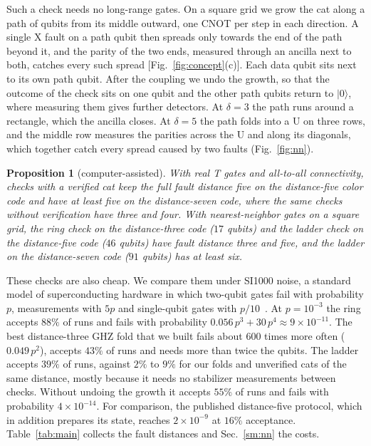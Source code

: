 \documentclass[aps,prl,reprint,twocolumn,amsmath,amssymb,floatfix,nofootinbib,superscriptaddress]{revtex4-2}
\newtheorem{proposition}[theorem]{Proposition}
\theoremstyle{definition}
\theoremstyle{remark}
\begin{document}
Such a check needs no long-range gates. On a square grid we grow the cat along a path of qubits from its middle outward, one CNOT per step in each direction. A single X fault on a path qubit then spreads only towards the end of the path beyond it, and the parity of the two ends, measured through an ancilla next to both, catches every such spread [Fig.~\ref{fig:concept}(c)]. Each data qubit sits next to its own path qubit. After the coupling we undo the growth, so that the outcome of the check sits on one qubit and the other path qubits return to $|0\rangle$, where measuring them gives further detectors. At $\delta=3$ the path runs around a rectangle, which the ancilla closes. At $\delta=5$ the path folds into a U on three rows, and the middle row measures the parities across the U and along its diagonals, which together catch every spread caused by two faults (Fig.~\ref{fig:nn}).
\begin{proposition}[computer-assisted]\label{prop:vcat}\label{prop:nn}
With real T gates and all-to-all connectivity, checks with a verified cat keep the full fault distance five on the distance-five color code and have at least five on the distance-seven code, where the same checks without verification have three and four. With nearest-neighbor gates on a square grid, the ring check on the distance-three code ($17$ qubits) and the ladder check on the distance-five code ($46$ qubits) have fault distance three and five, and the ladder on the distance-seven code ($91$ qubits) has at least six.
\end{proposition}
These checks are also cheap. We compare them under SI1000 noise, a standard model of superconducting hardware in which two-qubit gates fail with probability $p$, measurements with $5p$ and single-qubit gates with $p/10$~\cite{si1000}. At $p=10^{-3}$ the ring accepts $88\%$ of runs and fails with probability $0.056\,p^3+30\,p^4\approx9\times10^{-11}$. The best distance-three GHZ fold that we built fails about $600$ times more often ($0.049\,p^2$), accepts $43\%$ of runs and needs more than twice the qubits. The ladder accepts $39\%$ of runs, against $2\%$ to $9\%$ for our folds and unverified cats of the same distance, mostly because it needs no stabilizer measurements between checks. Without undoing the growth it accepts $55\%$ of runs and fails with probability $4\times10^{-14}$. For comparison, the published distance-five protocol, which in addition prepares its state, reaches $2\times10^{-9}$ at $16\%$ acceptance. Table~\ref{tab:main} collects the fault distances and Sec.~\ref{sm:nn} the costs.
\end{document}

